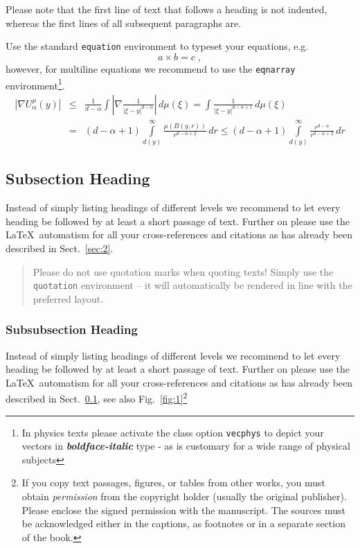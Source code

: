 \documentclass[graybox]{svmult}
\begin{document}
{Please note that the first line of text that follows a heading is not indented, whereas the first lines of all subsequent paragraphs are.

Use the standard \verb|equation| environment to typeset your equations, e.g.
%
\begin{equation}
a \times b = c\;,
\end{equation}
%
however, for multiline equations we recommend to use the \verb|eqnarray| environment\footnote{In physics texts please activate the class option \texttt{vecphys} to depict your vectors in \textbf{\itshape boldface-italic} type - as is customary for a wide range of physical subjects}.
\begin{eqnarray}
\left|\nabla U_{\alpha}^{\mu}(y)\right| &\le&\frac1{d-\alpha}\int
\left|\nabla\frac1{|\xi-y|^{d-\alpha}}\right|\,d\mu(\xi) =
\int \frac1{|\xi-y|^{d-\alpha+1}} \,d\mu(\xi)  \\
&=&(d-\alpha+1) \int\limits_{d(y)}^\infty
\frac{\mu(B(y,r))}{r^{d-\alpha+2}}\,dr \le (d-\alpha+1)
\int\limits_{d(y)}^\infty \frac{r^{d-\alpha}}{r^{d-\alpha+2}}\,dr
\label{eq:01}
\end{eqnarray}

\subsection{Subsection Heading}
\label{subsec:2}
Instead of simply listing headings of different levels we recommend to let every heading be followed by at least a short passage of text.  Further on please use the \LaTeX\ automatism for all your cross-references and citations as has already been described in Sect.~\ref{sec:2}.

\begin{quotation}
Please do not use quotation marks when quoting texts! Simply use the \verb|quotation| environment -- it will automatically be rendered in line with the preferred layout.
\end{quotation}


\subsubsection{Subsubsection Heading}
Instead of simply listing headings of different levels we recommend to let every heading be followed by at least a short passage of text.  Further on please use the \LaTeX\ automatism for all your cross-references and citations as has already been described in Sect.~\ref{subsec:2}, see also Fig.~\ref{fig:1}\footnote{If you copy text passages, figures, or tables from other works, you must obtain \textit{permission} from the copyright holder (usually the original publisher). Please enclose the signed permission with the manuscript. The sources must be acknowledged either in the captions, as footnotes or in a separate section of the book.}

}
\end{document}
